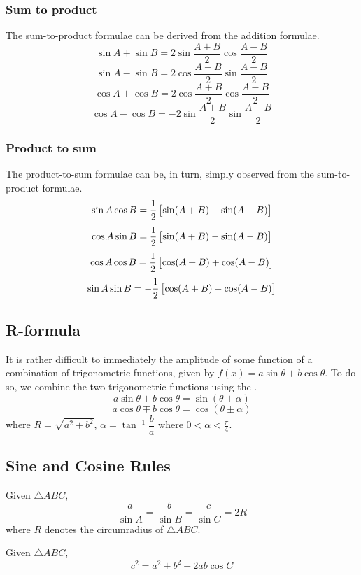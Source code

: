 \subsubsection{Sum to product}
The sum-to-product formulae can be derived from the addition formulae.
\[ \sin A + \sin B = 2 \sin \frac{A+B}{2} \cos \frac{A-B}{2} \]
\[ \sin A-\sin B = 2 \cos \frac{A+B}{2} \sin \frac{A-B}{2} \]
\[ \cos A + \cos B = 2 \cos \frac{A+B}{2} \cos \frac{A-B}{2} \]
\[ \cos A-\cos B = -2 \sin \frac{A+B}{2} \sin \frac{A-B}{2} \]

\subsubsection{Product to sum}
The product-to-sum formulae can be, in turn, simply observed from the sum-to-product formulae.
\[ \sin A \cos B = \frac{1}{2}\left[\sin(A+B)+\sin(A-B)\right] \]
\[ \cos A\sin B=\frac{1}{2}\left[\sin(A+B)-\sin(A-B)\right] \]
\[ \cos A\cos B = \frac{1}{2}\left[\cos(A+B)+\cos(A-B)\right] \]
\[ \sin A\sin B = -\frac{1}{2}\left[\cos(A+B)-\cos(A-B)\right] \]

\subsection{R-formula}
It is rather difficult to immediately the amplitude of some function of a combination of trigonometric functions, given by $f(x)=a\sin\theta+b\cos\theta$. To do so, we combine the two trigonometric functions using the .
\[ a \sin \theta \pm b \cos \theta = \sin (\theta \pm \alpha) \]
\[ a \cos \theta \mp b \cos \theta = \cos (\theta \pm \alpha) \]
where $R = \sqrt{a^2 + b^2}$,
$\alpha = \tan^{-1} \dfrac{b}{a}$ where $0 < \alpha < \frac{\pi}{4}$.

\subsection{Sine and Cosine Rules}
\begin{theorem} 
Given $\triangle ABC$,
\begin{equation}
\frac{a}{\sin A}=\frac{b}{\sin B}=\frac{c}{\sin C}=2R
\end{equation} 
where $R$ denotes the circumradius of $\triangle ABC$.
\end{theorem}

\begin{theorem}
Given $\triangle ABC$,
\begin{equation}
c^2=a^2+b^2-2ab\cos C
\end{equation} 
\end{theorem}

